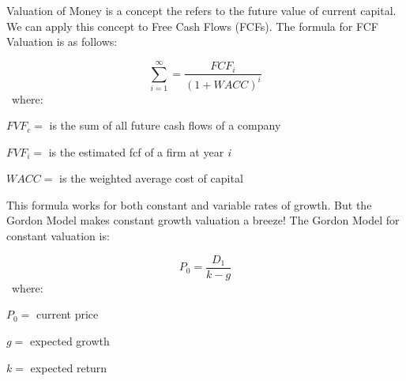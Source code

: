 \documentclass[a4paper,12pt]{article}
\begin{document}
\pagestyle{headings}


Valuation of Money is a concept the refers to the future value of 
current capital. We can apply this concept to Free Cash Flows 
(FCFs). The formula for FCF Valuation is as follows:
				
\[ \sum_{i=1}^\infty = \frac{FCF_i}{(1+WACC)^i} \]
\
where:\
	
$FVF_c =$ is the sum of all future cash flows of a company

$FVF_i =$ is the estimated fcf of a firm at year \textit{i}

$WACC =$ is the weighted average cost of capital\

This formula works for both constant and variable rates of growth. 
But the Gordon Model makes constant growth valuation a breeze! 
The Gordon Model for constant valuation is:

\[ P_0 = \frac{D_1}{k-g} \]
\
where:\

$P_0 =$ current price

$g =$ expected growth

$k=$ expected return
\end{document}
